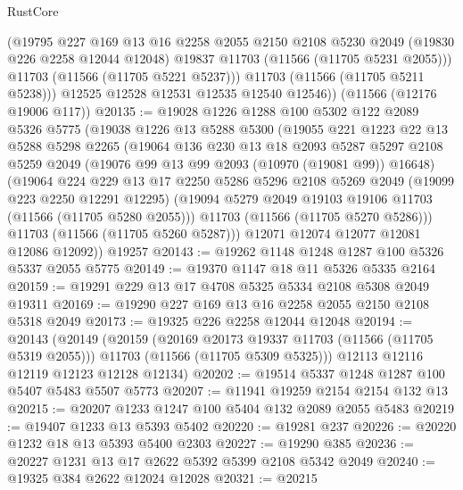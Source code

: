 \begin{lexlean}{RustCore}
\begin{coremodule}
            (@19795
              @227
              @169
              @13
              @16
              @2258
              @2055
              @2150
              @2108
              @5230
              @2049
              (@19830 @226 @2258 @12044 @12048)
              @19837
              @11703
              (@11566 (@11705 @5231 @2055)))
            @11703
            (@11566 (@11705 @5221 @5237)))
          @11703
          (@11566 (@11705 @5211 @5238)))
        @12525
        @12528
        @12531
        @12535
        @12540
        @12546))
    (@11566 (@12176 @19006 @117))
@20135 := @19028
    @1226
    @1288
    @100
    @5302
    @122
    @2089
    @5326
    @5775
    (@19038
      @1226
      @13
      @5288
      @5300
      (@19055
        @221
        @1223
        @22
        @13
        @5288
        @5298
        @2265
        (@19064
          @136
          @230
          @13
          @18
          @2093
          @5287
          @5297
          @2108
          @5259
          @2049
          (@19076 @99 @13 @99 @2093 (@10970 (@19081 @99)) @16648)
          (@19064
            @224
            @229
            @13
            @17
            @2250
            @5286
            @5296
            @2108
            @5269
            @2049
            (@19099 @223 @2250 @12291 @12295)
            (@19094 @5279 @2049 @19103 @19106 @11703 (@11566 (@11705 @5280 @2055)))
            @11703
            (@11566 (@11705 @5270 @5286)))
          @11703
          (@11566 (@11705 @5260 @5287)))
        @12071
        @12074
        @12077
        @12081
        @12086
        @12092))
    @19257
@20143 := @19262 @1148 @1248 @1287 @100 @5326 @5337 @2055 @5775
@20149 := @19370 @1147 @18 @11 @5326 @5335 @2164
@20159 := @19291 @229 @13 @17 @4708 @5325 @5334 @2108 @5308 @2049 @19311
@20169 := @19290 @227 @169 @13 @16 @2258 @2055 @2150 @2108 @5318 @2049
@20173 := @19325 @226 @2258 @12044 @12048
@20194 := @20143
    (@20149
      (@20159
        (@20169 @20173 @19337 @11703 (@11566 (@11705 @5319 @2055)))
        @11703
        (@11566 (@11705 @5309 @5325)))
      @12113
      @12116
      @12119
      @12123
      @12128
      @12134)
@20202 := @19514 @5337 @1248 @1287 @100 @5407 @5483 @5507 @5773
@20207 := @11941 @19259 @2154 @2154 @132 @13
@20215 := @20207 @1233 @1247 @100 @5404 @132 @2089 @2055 @5483
@20219 := @19407 @1233 @13 @5393 @5402
@20220 := @19281 @237
@20226 := @20220 @1232 @18 @13 @5393 @5400 @2303
@20227 := @19290 @385
@20236 := @20227 @1231 @13 @17 @2622 @5392 @5399 @2108 @5342 @2049
@20240 := @19325 @384 @2622 @12024 @12028
@20321 := @20215

\end{coremodule}
\end{lexlean}
